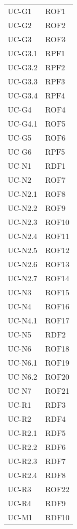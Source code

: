\begin{longtable}{| p{5cm} | p{5cm} |}
		UC-G1 & ROF1\\
		\rowcolor{LightGray}
		UC-G2 & ROF2\\
		UC-G3 & ROF3 \\
		\rowcolor{LightGray}
		UC-G3.1 & RPF1 \\
		UC-G3.2 & RPF2 \\
		\rowcolor{LightGray}
		UC-G3.3 & RPF3 \\
		UC-G3.4 & RPF4 \\
		\rowcolor{LightGray}
		UC-G4 & ROF4 \\
		UC-G4.1 & ROF5 \\
		\rowcolor{LightGray}
		UC-G5 & ROF6 \\
		UC-G6 & RPF5\\
		\rowcolor{LightGray}
		UC-N1 & RDF1\\
		UC-N2 & ROF7  \\
		\rowcolor{LightGray}
		UC-N2.1 & ROF8 \\
		UC-N2.2 & ROF9 \\
		\rowcolor{LightGray}
		UC-N2.3 & ROF10 \\
		UC-N2.4 & ROF11 \\
		\rowcolor{LightGray}
		UC-N2.5 & ROF12 \\
		UC-N2.6 & ROF13 \\
		\rowcolor{LightGray}
		UC-N2.7 & ROF14 \\	
		UC-N3 & ROF15\\	
		\rowcolor{LightGray}
		UC-N4 & ROF16\\
		UC-N4.1 & ROF17\\
		\rowcolor{LightGray}
		UC-N5 & RDF2 \\
		UC-N6 & ROF18 \\
		\rowcolor{LightGray}
		UC-N6.1 & ROF19 \\
		UC-N6.2 & ROF20 \\
		\rowcolor{LightGray}
		UC-N7 & ROF21\\
		UC-R1 & RDF3 \\
		\rowcolor{LightGray}
		UC-R2 & RDF4 \\
		UC-R2.1 & RDF5 \\
		\rowcolor{LightGray}
		UC-R2.2 & RDF6 \\
		UC-R2.3 & RDF7 \\
		\rowcolor{LightGray}
		UC-R2.4 & RDF8 \\
		UC-R3 & ROF22\\
		\rowcolor{LightGray}
		UC-R4 & RDF9 \\
		UC-M1 & RDF10 \\

\end{longtable}
